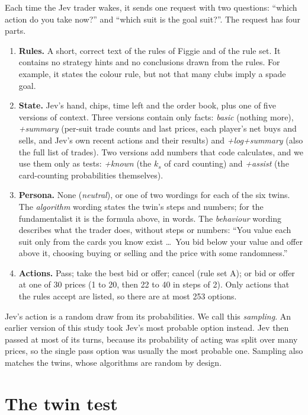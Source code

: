 \documentclass[10pt]{article}
\begin{document}
Each time the Jev trader wakes, it sends one request with two questions: ``which action do you take now?'' and ``which
suit is the goal suit?''. The request has four parts.
\begin{enumerate}
\item \textbf{Rules.} A short, correct text of the rules of Figgie and of the rule set. It contains no strategy hints
and no conclusions drawn from the rules. For example, it states the colour rule, but not that many clubs imply a
spade goal.
\item \textbf{State.} Jev's hand, chips, time left and the order book, plus one of five versions of context. Three
versions contain only facts: \emph{basic} (nothing more), \emph{+summary} (per-suit trade counts and last prices,
each player's net buys and sells, and Jev's own recent actions and their results) and \emph{+log+summary} (also the
full list of trades). Two versions add numbers that code calculates, and we use them only as tests:
\emph{+known} (the $k_s$ of card counting) and \emph{+assist} (the card-counting probabilities themselves).
\item \textbf{Persona.} None (\emph{neutral}), or one of two wordings for each of the six twins. The \emph{algorithm}
wording states the twin's steps and numbers; for the fundamentalist it is the formula above, in words. The
\emph{behaviour} wording describes what the trader does, without steps or numbers: ``You value each suit only from the
cards you know exist \dots\ You bid below your value and offer above it, choosing buying or selling and the price with
some randomness.''
\item \textbf{Actions.} Pass; take the best bid or offer; cancel (rule set A); or bid or offer at one of 30 prices (1 to
20, then 22 to 40 in steps of 2). Only actions that the rules accept are listed, so there are at most 253 options.
\end{enumerate}
Jev's action is a random draw from its probabilities. We call this \emph{sampling}. An earlier version of this study
took Jev's most probable option instead. Jev then passed at most of its turns, because its probability of acting was
split over many prices, so the single pass option was usually the most probable one. Sampling also matches the twins, whose algorithms are random by design.

\section{The twin test}\label{sec:method}
\end{document}
